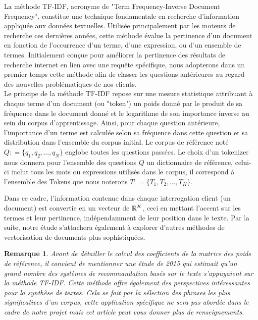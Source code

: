 \documentclass[12pt]{article}
\newtheorem{rmq}{Remarque}
\theoremstyle{definition}
\begin{document}
	La méthode TF-IDF, acronyme de "Term Frequency-Inverse Document Frequency", constitue une technique fondamentale en recherche d'information appliquée aux données textuelles. Utilisée principalement par les moteurs de recherche ces dernières années, cette méthode évalue la pertinence d'un document en fonction de l'occurrence d'un terme, d'une expression, ou d'un ensemble de termes. Initialement conçue pour améliorer la pertinence des résultats de recherche internet en lien avec une requête spécifique, nous adopterons dans un premier temps cette méthode afin de classer les questions antérieures au regard des nouvelles problématiques de nos clients.\\
	
	Le principe de la méthode TF-IDF repose sur une mesure statistique attribuant à chaque terme d'un document (ou "token") un poids donné par le produit de sa fréquence dans le document donné et le logarithme de son importance inverse au sein du corpus d'apprentissage. Ainsi, pour chaque question antérieure, l'importance d'un terme est calculée selon sa fréquence dans cette question et sa distribution dans l'ensemble du corpus initial. Le corpus de référence noté $Q : = \{q_1,q_2,\dots,q_N\}$ englobe toutes les questions passées. Le choix d'un tokenizer nous donnera pour l'ensemble des questions $Q$ un dictionnaire de référence, celui-ci inclut tous les mots ou expressions utilisés dans le corpus, il correspond à l'ensemble des Tokens que nous noterons $T : = \{T_1,T_2,\dots,T_K\}$.
	
	Dans ce cadre, l'information contenue dans chaque interrogation client (un document) est convertie en un vecteur de $\mathbb{R}^K$, ceci en mettant l'accent sur les termes et leur pertinence, indépendamment de leur position dans le texte. Par la suite, notre étude s'attachera également à explorer d'autres méthodes de vectorisation de documents plus sophistiquées.\\
	
	\begin{rmq}
		Avant de détailler le calcul des coefficients de la matrice des poids de référence, il convient de mentionner une étude de 2015 \cite{etude2015} qui estimait qu'un grand nombre des systèmes de recommandation basés sur le texte s'appuyaient sur la méthode TF-IDF. Cette méthode offre également des perspectives intéressantes pour la synthèse de textes. Cela se fait par la sélection des phrases les plus significatives d'un corpus, cette application spécifique ne sera pas abordée dans le cadre de notre projet mais cet article \cite{TFIDFsumup} peut vous donner plus de renseignements.
	\end{rmq}
	
\end{document}

